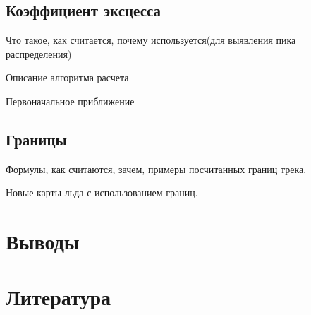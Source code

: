 \subsection*{Коэффициент эксцесса}
Что такое, как считается, почему используется(для выявления пика распределения)

Описание алгоритма расчета 

Первоначальное приближение

\subsection*{Границы}
Формулы, как считаются, зачем, примеры посчитанных границ трека.

Новые карты льда с использованием границ.

\section*{Выводы}
\section*{Литература}


